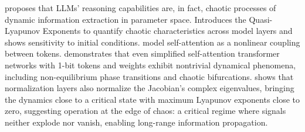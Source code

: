 \documentclass[a4paper,12pt]{article}
\begin{document}
\cite{li2025cognitive_activation} proposes that LLMs' reasoning capabilities are, in fact, chaotic processes of dynamic information extraction in parameter space.  Introduces the Quasi-Lyapunov Exponents to quantify chaotic characteristics across model layers and shows sensitivity to initial conditions.
\cite{geshkovski2025mathematicalperspectivetransformers} model self-attention as a nonlinear coupling between tokens.
\cite{dynamicalmeanfieldtheoryselfattention} demonstrates that even simplified self-attention transformer networks with 1-bit tokens and weights exhibit nontrivial dynamical phenomena, including non-equilibrium phase transitions and chaotic bifurcations. 
\cite{tomihari2025recurrent_self_attention_dynamics} shows that normalization layers also normalize the Jacobian's complex eigenvalues, bringing the dynamics close to a critical state with maximum Lyapunov exponents close to zero, suggesting operation at the edge of chaos: a critical regime where signals neither explode nor vanish, enabling long-range information propagation. %
\end{document}
